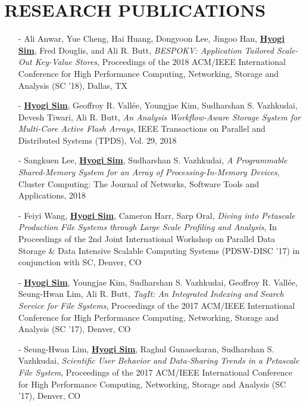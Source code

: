 \section{RESEARCH PUBLICATIONS} 
\begin{itemize}[leftmargin=*]
\setlength\itemsep{-0.02in}
\item[-] Ali Anwar, Yue Cheng, Hai Huang, Dongyoon Lee, Jingoo Han, \underline{\bf Hyogi Sim},
  Fred Douglis, and Ali R. Butt,
  {\it BESPOKV: Application Tailored Scale-Out Key-Value Stores},
  Proceedings of the 2018 ACM/IEEE International Conference for High
  Performance Computing, Networking, Storage and Analysis (SC '18), Dallas, TX 
\item[-] \underline{\bf Hyogi Sim}, Geoffroy R. Vall\'ee, 
	Youngjae Kim, Sudharshan S. Vazhkudai, Devesh Tiwari, Ali R. Butt,
  {\it An Analysis Workflow-Aware Storage System for Multi-Core Active Flash Arrays},
  IEEE Transactions on Parallel and Distributed Systems (TPDS), Vol. 29, 2018
\item[-] Sangkuen Lee, \underline{\bf Hyogi Sim}, Sudharshan S. Vazhkudai,
  {\it A Programmable Shared-Memory System for an Array of Processing-In-Memory Devices},
  Cluster Computing: The Journal of Networks, Software Tools and Applications, 2018
\item[-] Feiyi Wang, \underline{\bf Hyogi Sim}, Cameron Harr, Sarp Oral,
  {\it Diving into Petascale Production File Systems through 
       Large Scale Profiling and Analysis},
  In Proceedings of the 2nd Joint International Workshop on Parallel Data Storage 
  \& Data Intensive Scalable Computing Systems (PDSW-DISC '17)
  in conjunction with SC, Denver, CO
\item[-] \underline{\bf Hyogi Sim}, Youngjae Kim, Sudharshan S. Vazhkudai,
  Geoffroy R. Vall\'ee, Seung-Hwan Lim, Ali R. Butt,
  {\it TagIt: An Integrated Indexing and Search Service for File Systems},
  Proceedings of the 2017 ACM/IEEE International Conference for High
  Performance Computing, Networking, Storage and Analysis (SC '17), Denver, CO
\item[-] Seung-Hwan Lim, \underline{\bf Hyogi Sim}, Raghul Gunasekaran,
  Sudharshan S. Vazhkudai,
  {\it Scientific User Behavior and Data-Sharing Trends in a Petascale File System},
  Proceedings of the 2017 ACM/IEEE International Conference for High
  Performance Computing, Networking, Storage and Analysis (SC '17), Denver, CO

\end{itemize}
